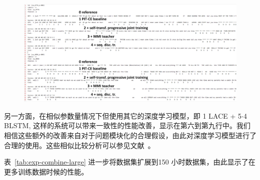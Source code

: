 \begin{figure}[!htp]
  \centering
    \captionstyle{\centering}
    \includegraphics[width=\textwidth]{figure/pit-example.pdf}
\end{figure}


另一方面，在相似参数量情况下但使用其它的深度学习模型，即 {1 LACE + 5$\cdot$4 BLSTM}, 这样的系统可以带来一致性的性能改善，显示在第六到第九行中。我们相信这些额外的改善来自对于问题模块化的合理假设，由此对深度学习模型进行了合理的使用。这些相似比较分析可以参见文献~\cite{chen2018progressive}。



表~\ref{tab:exp-combine-large} 进一步将数据集扩展到150 小时数据集，由此显示了在更多训练数据时候的性能。

